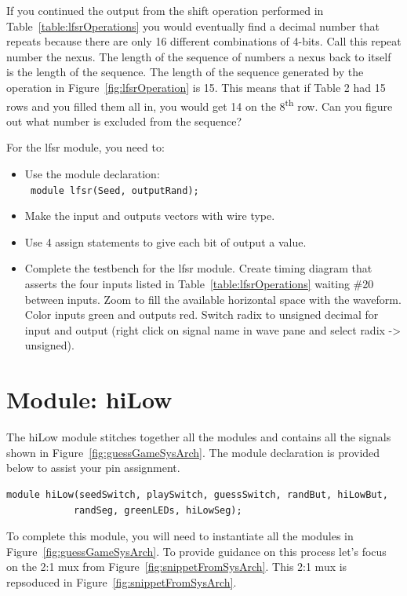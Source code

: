 If you continued the output from the shift operation performed in Table~\ref{table:lfsrOperations}
you would eventually find a decimal number that repeats because there
are only 16 different combinations of 4-bits. Call this repeat number
the nexus. The length of the sequence of numbers a nexus back to itself
is the length of the sequence. The length of the sequence generated by
the operation in Figure~\ref{fig:lfsrOperation} is 15. This means that if Table 2 had 15 rows
and you filled them all in, you would get 14 on the 8\textsuperscript{th} row. Can you figure out what number is excluded
from the sequence?

For the lfsr module, you need to:

\begin{itemize}
\item
Use the module declaration:\\
\verb+ module lfsr(Seed, outputRand);+

\item
Make the input and outputs vectors with wire type.
\item
\protect\hypertarget{lfsr_verilog}{}{}Use 4 assign statements to give
each bit of output a value.
\item
\protect\hypertarget{lfsr_testbench}{}{}Complete the testbench for the
lfsr module. Create timing diagram that asserts the four inputs listed
in Table~\ref{table:lfsrOperations}
waiting \#20 between inputs. Zoom to fill the available
horizontal space with the waveform. Color inputs green and outputs
red. Switch radix to unsigned decimal for input and output (right
    click on signal name in wave pane and select radix -\textgreater{}
unsigned).
\end{itemize}

\section{Module: hiLow}

The hiLow module stitches together all the modules and contains all
the signals shown in
Figure~\ref{fig:guessGameSysArch}. The module declaration is provided
below to assist your pin assignment.

\begin{verbatim}
module hiLow(seedSwitch, playSwitch, guessSwitch, randBut, hiLowBut,
            randSeg, greenLEDs, hiLowSeg);
\end{verbatim}

To complete this module, you will need to instantiate all the modules in
Figure~\ref{fig:guessGameSysArch}. To provide guidance on this process
let's focus on the 2:1 mux from Figure~\ref{fig:snippetFromSysArch}.  This
2:1 mux is repsoduced in Figure~\ref{fig:snippetFromSysArch}.

